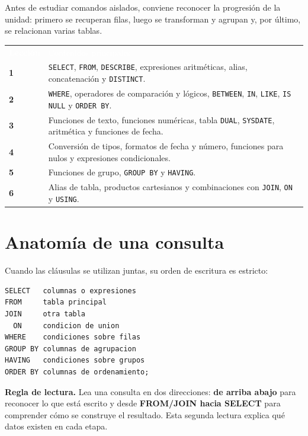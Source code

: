 \documentclass[10pt,letterpaper]{article}
\newenvironment{ideaclave}[1][Idea clave]
  {\par\smallskip\begingroup\raggedright
   \noindent\textcolor{turquesa}{\textbf{#1.}}\enspace}
  {\par\endgroup\smallskip}
\begin{document}
Antes de estudiar comandos aislados, conviene reconocer la progresión de la
unidad: primero se recuperan filas, luego se transforman y agrupan y, por
último, se relacionan varias tablas.

\begin{tabularx}{\textwidth}{>{\bfseries}p{1.5cm} X}
\rowcolor{azulsql}
\textcolor{white}{Lección} & \textcolor{white}{Contenidos principales} \\
1 & \lstinline|SELECT|, \lstinline|FROM|, \lstinline|DESCRIBE|, expresiones
aritméticas, alias, concatenación y \lstinline|DISTINCT|. \\
2 & \lstinline|WHERE|, operadores de comparación y lógicos,
\lstinline|BETWEEN|, \lstinline|IN|, \lstinline|LIKE|,
\lstinline|IS NULL| y \lstinline|ORDER BY|. \\
3 & Funciones de texto, funciones numéricas, tabla \lstinline|DUAL|,
\lstinline|SYSDATE|, aritmética y funciones de fecha. \\
4 & Conversión de tipos, formatos de fecha y número, funciones para nulos y
expresiones condicionales. \\
5 & Funciones de grupo, \lstinline|GROUP BY| y \lstinline|HAVING|. \\
6 & Alias de tabla, productos cartesianos y combinaciones con
\lstinline|JOIN|, \lstinline|ON| y \lstinline|USING|. \\
\end{tabularx}

\section{Anatomía de una consulta}

Cuando las cláusulas se utilizan juntas, su orden de escritura es estricto:

\begin{lstlisting}
SELECT   columnas o expresiones
FROM     tabla principal
JOIN     otra tabla
  ON     condicion de union
WHERE    condiciones sobre filas
GROUP BY columnas de agrupacion
HAVING   condiciones sobre grupos
ORDER BY columnas de ordenamiento;
\end{lstlisting}

\begin{ideaclave}[Regla de lectura]
Lea una consulta en dos direcciones: \textbf{de arriba abajo} para reconocer lo
que está escrito y desde \textbf{FROM/JOIN hacia SELECT} para comprender cómo se
construye el resultado. Esta segunda lectura explica qué datos existen en cada
etapa.
\end{ideaclave}
\end{document}
